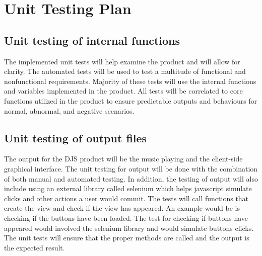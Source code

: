 \documentclass[12pt, titlepage]{article}
\begin{document}
\section{Unit Testing Plan}
		
\subsection{Unit testing of internal functions}
The implemented unit tests will help examine the product and will allow for clarity. The automated tests will be used to test a multitude of functional and nonfunctional requirements.  Majority of these tests will use the internal functions and variables implemented in the product. All tests will be correlated to core functions utilized in the product to ensure predictable outputs and behaviours for normal, abnormal, and negative scenarios.
		
\subsection{Unit testing of output files}		
The output for the DJS product will be the music playing and the client-side graphical interface. The unit testing for output will be done with the combination of both manual and automated testing. In addition, the testing of output will also include using an external library called selenium which helps javascript simulate clicks and other actions a user would commit. The tests will call functions that create the view and check if the view has appeared. An example would be is checking if the buttons have been loaded. The test for checking if buttons have appeared would involved the selenium library and would simulate buttons clicks. The unit tests will ensure that the proper methods are called and the output is the expected result. 




\newpage
\end{document}
